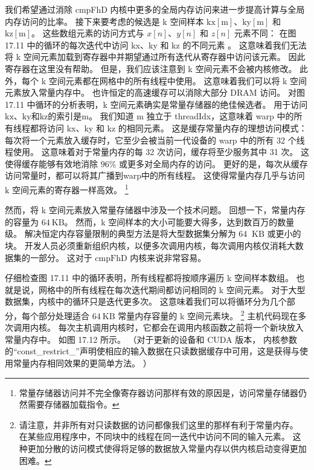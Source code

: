 我们希望通过消除 cmpFhD 内核中更多的全局内存访问来进一步提高计算与全局内存访问的比率。 
接下来要考虑的候选是 $\mathrm{k}$ 空间样本 $\mathrm{kx}[\mathrm{m}]、\mathrm{ky}[\mathrm{m}]$ 
和 $\mathrm{ kz}[\mathrm{m}]$。 这些数组元素的访问方式与 $x[n]、y[n]$ 和 $z[n]$ 元素不同：
在图 17.11 中的循环的每次迭代中访问 kx、ky 和 kz 的不同元素 。 
这意味着我们无法将 k 空间元素加载到寄存器中并期望通过所有迭代从寄存器中访问该元素。 因此寄存器在这里没有帮助。 
但是，我们应该注意到 k 空间元素不会被内核修改。 此外，每个 k 空间元素都在网格中的所有线程中使用。 
这意味着我们可以将 k 空间元素放入常量内存中。 也许恒定的高速缓存可以消除大部分 DRAM 访问。 
对图 17.11 中循环的分析表明，k 空间元素确实是常量存储器的绝佳候选者。 
用于访问$\mathrm{kx}、\mathrm{ky}$和$\mathrm{kz}$的索引是$\mathrm{m}$。 
我们知道 $\mathrm{m}$ 独立于 threadIdx，这意味着 warp 中的所有线程都将访问 kx、ky 和 kz 的相同元素。 
这是缓存常量内存的理想访问模式：每次将一个元素放入缓存时，它至少会被当前一代设备的 warp 中的所有 32 个线程使用。 
这意味着对于常量内存的每 32 次访问，缓存将至少服务其中 31 次。 这使得缓存能够有效地消除 $96 \%$ 或更多对全局内存的访问。 
更好的是，每次从缓存访问常量时，都可以将其广播到warp中的所有线程。 
这使得常量内存几乎与访问 $\mathrm{k}$ 空间元素的寄存器一样高效。
\footnote{常量存储器访问并不完全像寄存器访问那样有效的原因是，访问常量存储器仍然需要存储器加载指令。}

然而，将 k 空间元素放入常量存储器中涉及一个技术问题。 回想一下，常量内存的容量为 $64 \mathrm{~KB}$。 
然而，k 空间样本的大小可能要大得多，达到数百万的数量级。 
解决恒定内存容量限制的典型方法是将大型数据集分解为 64 $\mathrm{~KB}$ 或更小的块。 
开发人员必须重新组织内核，以便多次调用内核，每次调用内核仅消耗大数据集的一部分。 
这对于 $\mathrm{cmpFhD}$ 内核来说非常容易。

仔细检查图 17.11 中的循环表明，所有线程都将按顺序遍历 k 空间样本数组。 
也就是说，网格中的所有线程在每次迭代期间都访问相同的 k 空间元素。 对于大型数据集，内核中的循环只是迭代更多次。 
这意味着我们可以将循环分为几个部分，每个部分处理适合 $64 \mathrm{~KB}$ 常量内存容量的 k 空间元素块。 
\footnote{请注意，并非所有对只读数据的访问都像我们这里的那样有利于常量内存。 
在某些应用程序中，不同块中的线程在同一迭代中访问不同的输入元素。 
这种更加分散的访问模式使得将足够的数据放入常量内存以供内核启动变得更加困难。}
主机代码现在多次调用内核。 每次主机调用内核时，它都会在调用内核函数之前将一个新块放入常量内存中。 
如图 17.12 所示。 （对于更新的设备和 CUDA 版本，
内核参数的“const\_restrict\_”声明使相应的输入数据在只读数据缓存中可用，这是获得与使用常量内存相同效果的更简单方法。 ）

